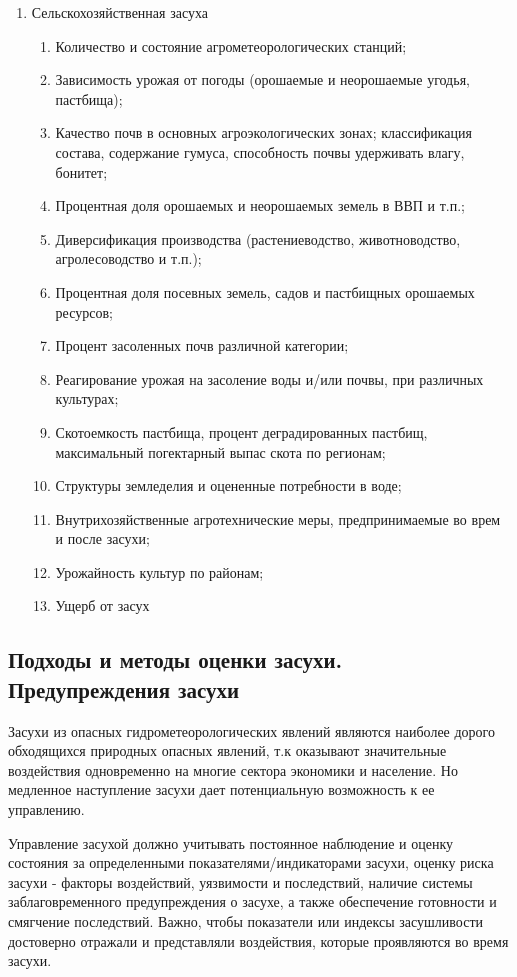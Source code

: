 \begin{enumerate}
	\item Сельскохозяйственная засуха

	\begin{enumerate}
		\item Количество и состояние агрометеорологических станций;
		\item Зависимость урожая от погоды (орошаемые и неорошаемые угодья, пастбища);
		\item Качество почв в основных агроэкологических зонах; классификация состава, содержание гумуса, способность почвы удерживать влагу, бонитет;
		\item Процентная доля орошаемых и неорошаемых земель в ВВП и т.п.;
		\item Диверсификация производства (растениеводство, животноводство, агролесоводство и т.п.);
		\item Процентная доля посевных земель, садов и пастбищных орошаемых ресурсов;
		\item Процент засоленных почв различной категории;
		\item Реагирование урожая на засоление воды и/или почвы, при различных культурах;
		\item Скотоемкость пастбища, процент деградированных пастбищ, максимальный погектарный выпас скота по регионам;
		\item Структуры земледелия и оцененные потребности в воде;
		\item Внутрихозяйственные агротехнические меры, предпринимаемые во врем и после засухи;
		\item Урожайность культур по районам;
		\item Ущерб от засух
	\end{enumerate}
\end{enumerate}

\subsection{Подходы и методы оценки засухи. Предупреждения засухи}

Засухи из опасных гидрометеорологических явлений являются наиболее дорого обходящихся природных опасных явлений, т.к оказывают значительные воздействия одновременно на многие сектора экономики и население. Но медленное наступление засухи дает потенциальную возможность к ее управлению. 

Управление засухой должно учитывать постоянное наблюдение и оценку состояния за определенными показателями/индикаторами засухи, оценку риска засухи - факторы воздействий, уязвимости и последствий, наличие системы заблаговременного предупреждения о засухе, а также обеспечение готовности и смягчение последствий. Важно, чтобы показатели или индексы засушливости достоверно отражали и представляли воздействия, которые проявляются во время засухи.

